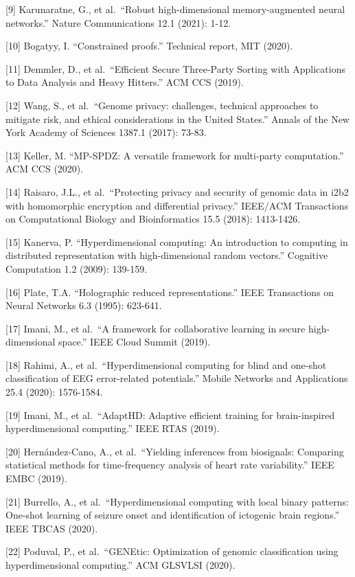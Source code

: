 \documentclass[
  11pt,
]{article}
\begin{document}
{[}9{]} Karunaratne, G., et al.~``Robust high-dimensional
memory-augmented neural networks.'' Nature Communications 12.1 (2021):
1-12.

{[}10{]} Bogatyy, I. ``Constrained proofs.'' Technical report, MIT
(2020).

{[}11{]} Demmler, D., et al.~``Efficient Secure Three-Party Sorting with
Applications to Data Analysis and Heavy Hitters.'' ACM CCS (2019).

{[}12{]} Wang, S., et al.~``Genome privacy: challenges, technical
approaches to mitigate risk, and ethical considerations in the United
States.'' Annals of the New York Academy of Sciences 1387.1 (2017):
73-83.

{[}13{]} Keller, M. ``MP-SPDZ: A versatile framework for multi-party
computation.'' ACM CCS (2020).

{[}14{]} Raisaro, J.L., et al.~``Protecting privacy and security of
genomic data in i2b2 with homomorphic encryption and differential
privacy.'' IEEE/ACM Transactions on Computational Biology and
Bioinformatics 15.5 (2018): 1413-1426.

{[}15{]} Kanerva, P. ``Hyperdimensional computing: An introduction to
computing in distributed representation with high-dimensional random
vectors.'' Cognitive Computation 1.2 (2009): 139-159.

{[}16{]} Plate, T.A. ``Holographic reduced representations.'' IEEE
Transactions on Neural Networks 6.3 (1995): 623-641.

{[}17{]} Imani, M., et al.~``A framework for collaborative learning in
secure high-dimensional space.'' IEEE Cloud Summit (2019).

{[}18{]} Rahimi, A., et al.~``Hyperdimensional computing for blind and
one-shot classification of EEG error-related potentials.'' Mobile
Networks and Applications 25.4 (2020): 1576-1584.

{[}19{]} Imani, M., et al.~``AdaptHD: Adaptive efficient training for
brain-inspired hyperdimensional computing.'' IEEE RTAS (2019).

{[}20{]} Hernández-Cano, A., et al.~``Yielding inferences from
biosignals: Comparing statistical methods for time-frequency analysis of
heart rate variability.'' IEEE EMBC (2019).

{[}21{]} Burrello, A., et al.~``Hyperdimensional computing with local
binary patterns: One-shot learning of seizure onset and identification
of ictogenic brain regions.'' IEEE TBCAS (2020).

{[}22{]} Poduval, P., et al.~``GENEtic: Optimization of genomic
classification using hyperdimensional computing.'' ACM GLSVLSI (2020).
\end{document}
